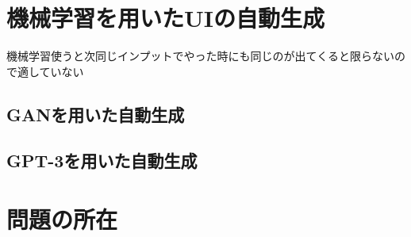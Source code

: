 \section{機械学習を用いたUIの自動生成}
機械学習使うと次同じインプットでやった時にも同じのが出てくると限らないので適していない
\subsection{GANを用いた自動生成}

\subsection{GPT-3を用いた自動生成}


\section{問題の所在}
